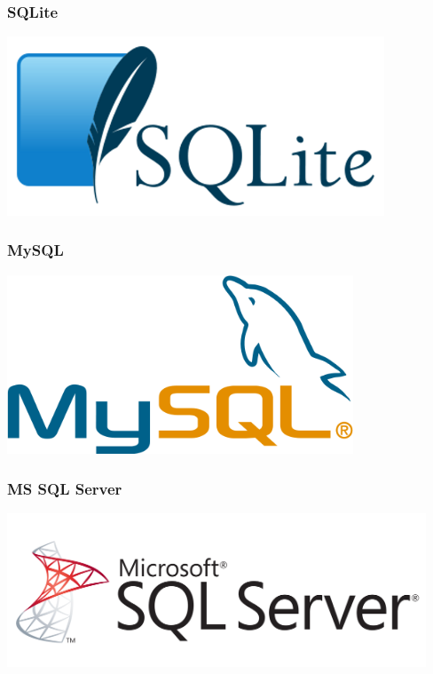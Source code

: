 \documentclass{beamer}
\begin{document}
\begin{frame}
  \frametitle{SQLite}


  \begin{center}
    \includegraphics[height=2.1in]{SQLite.png}
  \end{center}
\end{frame}

\begin{frame}
  \frametitle{MySQL}


  \begin{center}
    \includegraphics[height=2.1in]{mysql.png}
  \end{center}
\end{frame}

\begin{frame}
  \frametitle{MS SQL Server}


  \begin{center}
    \includegraphics[height=1.8in]{mssql.png}
  \end{center}
\end{frame}
\end{document}
